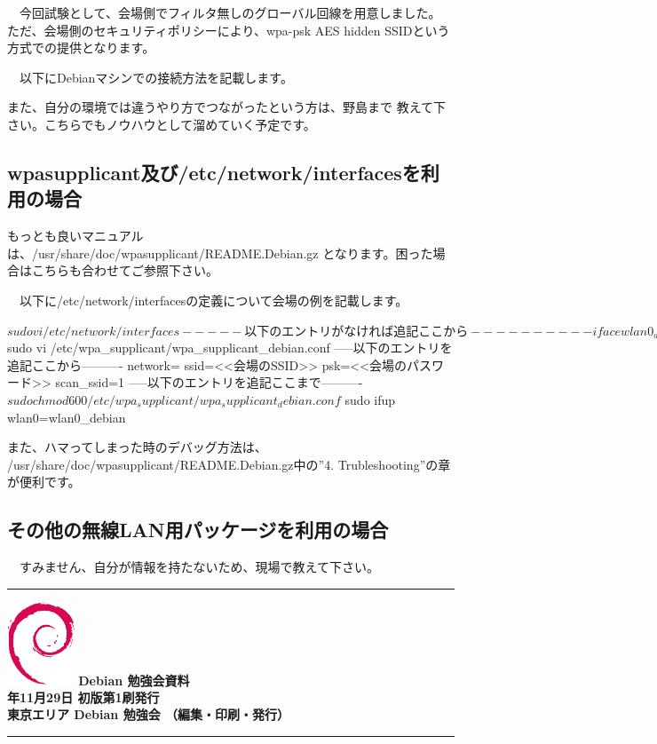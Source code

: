 \documentclass[mingoth,a4paper]{jsarticle}
\newcommand{\debmtgyear}{2014}
\newcommand{\debmtgmonth}{11}
\newcommand{\debmtgdate}{29}
\begin{document}
　今回試験として、会場側でフィルタ無しのグローバル回線を用意しました。
ただ、会場側のセキュリティポリシーにより、wpa-psk AES hidden SSIDという
方式での提供となります。

　以下にDebianマシンでの接続方法を記載します。

 また、自分の環境では違うやり方でつながったという方は、野島まで
教えて下さい。こちらでもノウハウとして溜めていく予定です。

 \subsection{wpasupplicant及び/etc/network/interfacesを利用の場合}

 もっとも良いマニュアルは、/usr/share/doc/wpasupplicant/README.Debian.gz
となります。困った場合はこちらも合わせてご参照下さい。

　以下に/etc/network/interfacesの定義について会場の例を記載します。

\begin{commandline}
$ sudo vi /etc/network/interfaces
-----以下のエントリがなければ追記ここから----------
iface wlan0_debian inet dhcp
     wpa-conf /etc/wpa_supplicant/wpa_supplicant_debian.conf
-----以下のエントリがなければ追記ここまで----------
$ sudo vi /etc/wpa_supplicant/wpa_supplicant_debian.conf
-----以下のエントリを追記ここから----------
network={
     ssid=<<会場のSSID>>
     psk=<<会場のパスワード>>
     scan_ssid=1
}
-----以下のエントリを追記ここまで----------
$ sudo chmod 600 /etc/wpa_supplicant/wpa_supplicant_debian.conf
$ sudo ifup wlan0=wlan0_debian
\end{commandline}

 また、ハマってしまった時のデバッグ方法は、
/usr/share/doc/wpasupplicant/README.Debian.gz中の''4. Trubleshooting''の章が便利です。

 \subsection{その他の無線LAN用パッケージを利用の場合}

　すみません、自分が情報を持たないため、現場で教えて下さい。
 
\cleartooddpage

\vspace*{15cm}
\hrule
\vspace{2mm}
\includegraphics[width=2cm]{image200502/openlogo-nd.eps}
\noindent \Large \bf Debian 勉強会資料\\
\noindent \normalfont \debmtgyear{}年\debmtgmonth{}月\debmtgdate{}日 \hspace{5mm}  初版第1刷発行\\
\noindent \normalfont 東京エリア Debian 勉強会 （編集・印刷・発行）\\
\hrule
\end{document}
